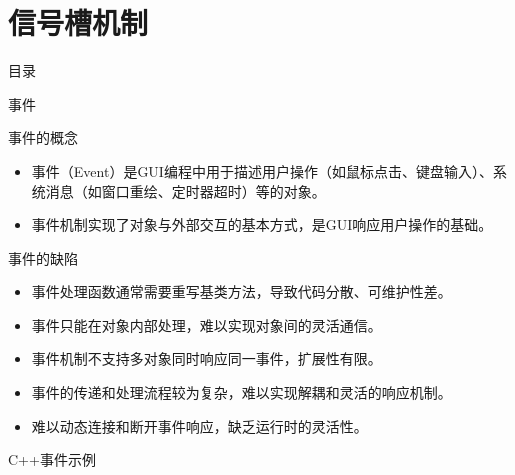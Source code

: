 \documentclass[UTF8,aspectratio=169]{beamer}
\begin{document}
\section{信号槽机制}
\begin{frame}{目录}
    \begin{multicols}{2}
        \tableofcontents[currentsection]
    \end{multicols}
\end{frame}

\begin{frame}{事件}
\begin{ytublock}{事件的概念}
    \begin{itemize}
        \item 事件（Event）是GUI编程中用于描述用户操作（如鼠标点击、键盘输入）、系统消息（如窗口重绘、定时器超时）等的对象。
        \item 事件机制实现了对象与外部交互的基本方式，是GUI响应用户操作的基础。
    \end{itemize}
\end{ytublock}
\begin{ytublock}{事件的缺陷}
    \begin{itemize}
        \item 事件处理函数通常需要重写基类方法，导致代码分散、可维护性差。
        \item 事件只能在对象内部处理，难以实现对象间的灵活通信。
        \item 事件机制不支持多对象同时响应同一事件，扩展性有限。
        \item 事件的传递和处理流程较为复杂，难以实现解耦和灵活的响应机制。
        \item 难以动态连接和断开事件响应，缺乏运行时的灵活性。
    \end{itemize}
\end{ytublock}
\end{frame}

\begin{frame}[fragile]{C++事件示例}
    \begin{columns}
        \begin{column}{0.48\textwidth}
            \inputminted[firstline=1,lastline=18]{cpp}{code/cpp_event_example.cpp}
        \end{column}
        \begin{column}{0.48\textwidth}
            \inputminted[firstline=20,lastline=40]{cpp}{code/cpp_event_example.cpp}
        \end{column}
    \end{columns}
\end{frame}
\end{document}
